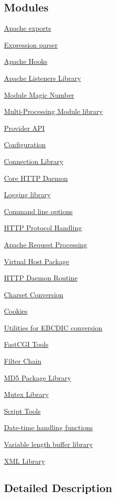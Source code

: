 \subsection*{Modules}
\begin{DoxyCompactItemize}
\item 
\hyperlink{group__exports}{Apache exports}
\item 
\hyperlink{group__AP__EXPR}{Expression parser}
\item 
\hyperlink{group__hooks}{Apache Hooks}
\item 
\hyperlink{group__APACHE__CORE__LISTEN}{Apache Listeners Library}
\item 
\hyperlink{group__APACHE__CORE__MMN}{Module Magic Number}
\item 
\hyperlink{group__APACHE__CORE__MPM}{Multi-\/\+Processing Module library}
\item 
\hyperlink{group__APACHE__CORE__PROVIDER}{Provider A\+PI}
\item 
\hyperlink{group__APACHE__CORE__CONFIG}{Configuration}
\item 
\hyperlink{group__APACHE__CORE__CONNECTION}{Connection Library}
\item 
\hyperlink{group__APACHE__CORE__HTTPD}{Core H\+T\+T\+P Daemon}
\item 
\hyperlink{group__APACHE__CORE__LOG}{Logging library}
\item 
\hyperlink{group__APACHE__CORE__MAIN}{Command line options}
\item 
\hyperlink{group__APACHE__CORE__PROTO}{H\+T\+T\+P Protocol Handling}
\item 
\hyperlink{group__APACHE__CORE__REQ}{Apache Request Processing}
\item 
\hyperlink{group__APACHE__CORE__VHOST}{Virtual Host Package}
\item 
\hyperlink{group__APACHE__CORE__DAEMON}{H\+T\+T\+P Daemon Routine}
\item 
\hyperlink{group__APACHE__CORE__CHARSET}{Charset Conversion}
\item 
\hyperlink{group__APACHE__CORE__COOKIE}{Cookies}
\item 
\hyperlink{group__APACHE__CORE__EBCDIC}{Utilities for E\+B\+C\+D\+I\+C conversion}
\item 
\hyperlink{group__APACHE__CORE__FASTCGI}{Fast\+C\+G\+I Tools}
\item 
\hyperlink{group__APACHE__CORE__FILTER}{Filter Chain}
\item 
\hyperlink{group__APACHE__CORE__MD5}{M\+D5 Package Library}
\item 
\hyperlink{group__APACHE__CORE__MUTEX}{Mutex Library}
\item 
\hyperlink{group__APACHE__CORE__SCRIPT}{Script Tools}
\item 
\hyperlink{group__APACHE__CORE__TIME}{Date-\/time handling functions}
\item 
\hyperlink{group__APACHE__CORE__VARBUF}{Variable length buffer library}
\item 
\hyperlink{group__APACHE__CORE__XML}{X\+M\+L Library}
\end{DoxyCompactItemize}


\subsection{Detailed Description}
